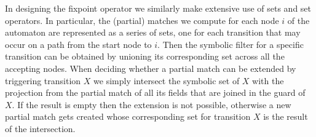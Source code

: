 In designing the fixpoint operator we similarly make extensive use of sets and 
set operators.
In particular, the (partial) matches we compute for each node $i$ of the 
automaton are represented as a series of sets, one for each transition that may 
occur on a path from the start node to $i$.
Then the symbolic filter for a specific transition can be obtained by unioning 
its corresponding set across all the accepting nodes.
When deciding whether a partial match can be extended by triggering transition 
$X$ we simply intersect the symbolic set of $X$ with the projection from the 
partial match of all its fields that are joined in the guard of $X$.
If the result is empty then the extension is not possible, otherwise a new 
partial match gets created whose corresponding set for transition $X$ is the 
result of the intersection.   





 

